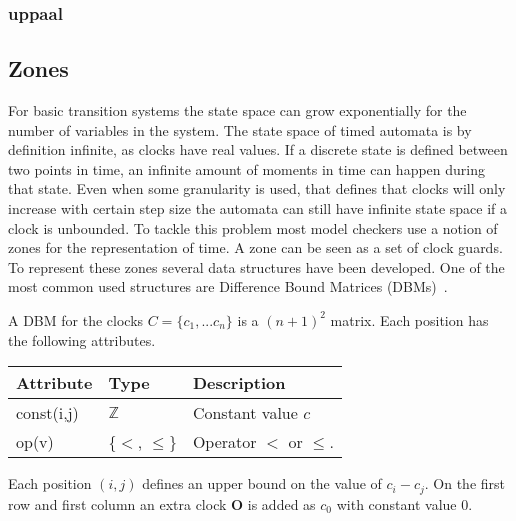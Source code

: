 \subsubsection{uppaal}

\subsection{Zones}
For basic transition systems the state space can grow exponentially for the number of variables in the system. The state space of timed automata is by definition infinite, as clocks have real values. If a discrete state is defined between two points in time, an infinite amount of moments in time can happen during that state. Even when some granularity is used, that defines that clocks will only increase with certain step size the automata can still have infinite state space if a clock is unbounded. To tackle this problem most model checkers use a notion of zones for the representation of time. A zone can be seen as a set of clock guards. To represent these zones several data structures have been developed. One of the most common used structures are Difference Bound Matrices (DBMs)~\cite{dbmorig,bengtsson2002clocks}.

\begin{mydef}
A DBM for the clocks $C = \{c_1,...c_n\}$ is a $(n+1)^2$ matrix. Each position has the following attributes.

\begin{tabular}{lll}
Attribute                & Type                      & Description                                           \\\hline
const(i,j)               & $\mathbb{Z}$             & Constant value $c$ \\
op(v)                    & \{$<$, $\leq\}$     & Operator $<$ or $\leq$.                         \\
\end{tabular}

Each position $(i,j)$ defines an upper bound on the value of $c_i - c_j$. On the first row and first column an extra clock $\mathbf{O}$ is added as $c_0$ with constant value 0. 
\end{mydef}
 
